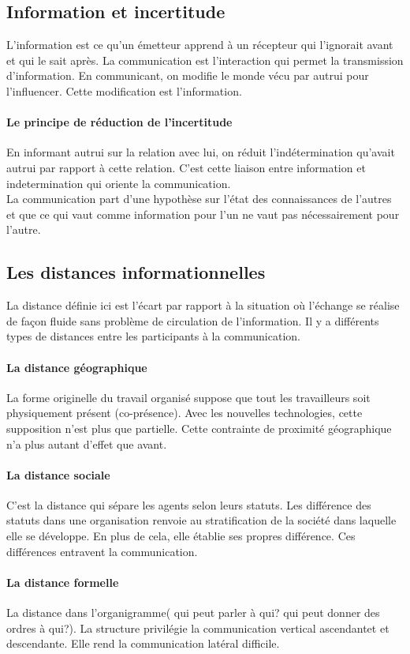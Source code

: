 \documentclass[11pt]{article} %
\begin{document}
	\subsection{Information et incertitude}
		L'information est ce qu'un émetteur apprend à un récepteur qui l'ignorait avant et qui le sait après. La
		communication est l'interaction qui permet la transmission d'information. En communicant, on modifie 
		le monde vécu par autrui pour l'influencer. Cette modification est l'information.
		\paragraph{Le principe de réduction de l'incertitude} En informant autrui sur la relation avec lui, on 
		réduit l'indétermination qu'avait autrui par rapport à cette relation. C'est cette liaison entre information 
		et indetermination qui oriente la communication.\\
		La communication part d'une hypothèse sur l'état des connaissances de l'autres et que ce qui vaut 
		comme information pour l'un ne vaut pas nécessairement pour l'autre.

	\subsection{Les distances informationnelles}
		La distance définie ici est l'écart par rapport à la situation où l'échange se réalise de façon fluide
		sans problème de circulation de l'information. Il y a différents types de distances entre les participants 
		à la communication. 
		\paragraph{La distance géographique} La forme originelle du travail organisé suppose que tout les 
		travailleurs soit physiquement présent (co-présence). Avec les nouvelles technologies, cette supposition 
		n'est plus que partielle. Cette contrainte de proximité géographique n'a plus autant d'effet que avant.
		\paragraph{La distance sociale} C'est la distance qui sépare les agents selon leurs statuts. Les 
		différence des statuts dans une organisation renvoie au stratification de la société dans laquelle elle se 
		développe. En plus de cela, elle établie ses propres différence. Ces différences entravent la 
		communication.
		\paragraph{La distance formelle} La distance dans l'organigramme( qui peut parler à qui? qui peut 
		donner des ordres à qui?). La structure privilégie la communication vertical ascendantet et 
		descendante. Elle rend la communication latéral difficile.
\end{document}
